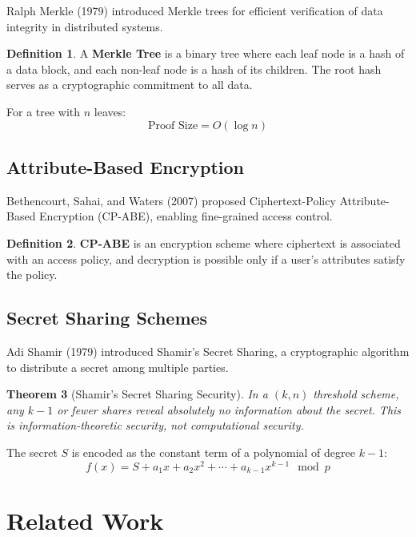 \documentclass[12pt]{report}
\theoremstyle{plain}
\newtheorem{theorem}{Theorem}[section]
\theoremstyle{definition}
\newtheorem{definition}[theorem]{Definition}
\theoremstyle{remark}
\begin{document}
Ralph Merkle (1979) introduced Merkle trees for efficient verification of data integrity in distributed systems.

\begin{definition}
A \textbf{Merkle Tree} is a binary tree where each leaf node is a hash of a data block, and each non-leaf node is a hash of its children. The root hash serves as a cryptographic commitment to all data.
\end{definition}

For a tree with $n$ leaves:
\begin{equation}
\text{Proof Size} = O(\log n)
\end{equation}

\subsection{Attribute-Based Encryption}

Bethencourt, Sahai, and Waters (2007) proposed Ciphertext-Policy Attribute-Based Encryption (CP-ABE), enabling fine-grained access control.

\begin{definition}
\textbf{CP-ABE} is an encryption scheme where ciphertext is associated with an access policy, and decryption is possible only if a user's attributes satisfy the policy.
\end{definition}

\subsection{Secret Sharing Schemes}

Adi Shamir (1979) introduced Shamir's Secret Sharing, a cryptographic algorithm to distribute a secret among multiple parties.

\begin{theorem}[Shamir's Secret Sharing Security]
In a $(k, n)$ threshold scheme, any $k-1$ or fewer shares reveal absolutely no information about the secret. This is information-theoretic security, not computational security.
\end{theorem}

The secret $S$ is encoded as the constant term of a polynomial of degree $k-1$:
\begin{equation}
f(x) = S + a_1x + a_2x^2 + \cdots + a_{k-1}x^{k-1} \mod p
\end{equation}

\section{Related Work}
\end{document}
